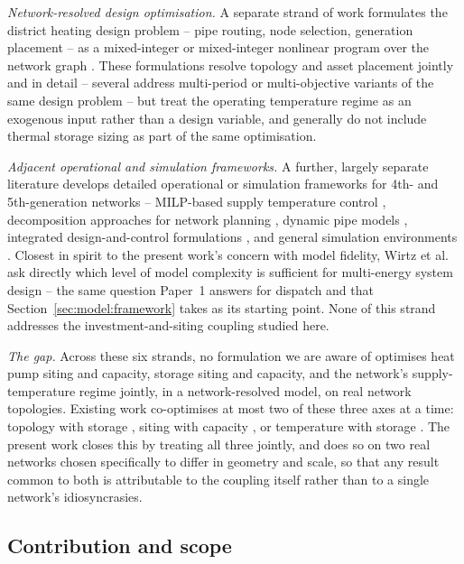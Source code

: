 \documentclass[review,3p]{elsarticle}
\begin{document}
\emph{Network-resolved design optimisation.} A separate strand of work
formulates the district heating design problem -- pipe routing, node
selection, generation placement -- as a mixed-integer or mixed-integer
nonlinear program over the network graph
\cite{Mertz.2016,Bordin.2016,Blommaert.2020,Resimont.2021,Marty.2018,
Marquant.2018,Weinand.2019,Wang.2023,Wack.2023,Wack.2023b,Wack.2024,
Vieth.2025,Egberts.2020,Roland.2020,Guo.2024,Dorotic.2019,Sameti.2019}.
These formulations resolve topology and asset placement jointly and in
detail -- several address multi-period or multi-objective variants of
the same design problem -- but treat the operating temperature regime as
an exogenous input rather than a design variable, and generally do not
include thermal storage sizing as part of the same optimisation.

\emph{Adjacent operational and simulation frameworks.} A further,
largely separate literature develops detailed operational or simulation
frameworks for 4th- and 5th-generation networks -- MILP-based supply
temperature control \cite{Wirtz.2021}, decomposition approaches for
network planning \cite{Wirtz.2023}, dynamic pipe models
\cite{vanderHeijde.2017}, integrated design-and-control formulations
\cite{vanderHeijde.2019}, and general simulation environments
\cite{Schweiger.2017}. Closest in spirit to the present work's concern
with model fidelity, Wirtz et al.\ \cite{Wirtz.2021b} ask directly which
level of model complexity is sufficient for multi-energy system design
-- the same question Paper~1 \cite{Ruess.2026} answers for dispatch and
that Section~\ref{sec:model:framework} takes as its starting point. None
of this strand addresses the investment-and-siting coupling studied
here.

\emph{The gap.} Across these six strands, no formulation we are aware
of optimises heat pump siting and capacity, storage siting and capacity,
and the network's supply-temperature regime jointly, in a
network-resolved model, on real network topologies. Existing work
co-optimises at most two of these three axes at a time: topology with
storage \cite{Ceruti.2025}, siting with capacity
\cite{Hering.2021,Hering.2022}, or temperature with storage
\cite{Li.2022}. The present work closes this by treating all three
jointly, and does so on two real networks chosen specifically to differ
in geometry and scale, so that any result common to both is
attributable to the coupling itself rather than to a single network's
idiosyncrasies.

\subsection{Contribution and scope}
\label{sec:intro:contribution}
\end{document}
